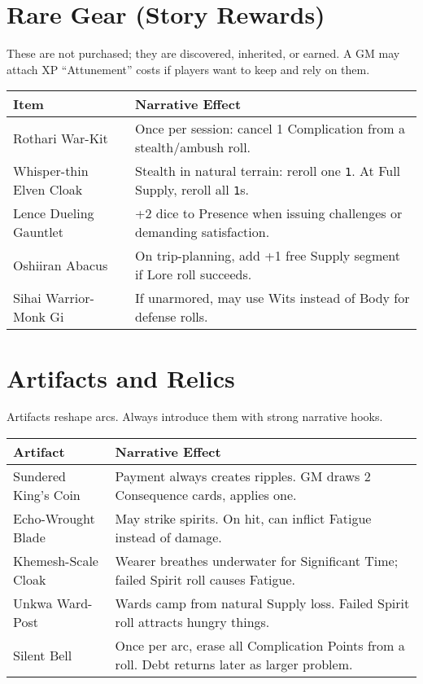 \documentclass[12pt]{book}
\begin{document}
\section{Rare Gear (Story Rewards)}
These are not purchased; they are discovered, inherited, or earned.  
A GM may attach XP “Attunement” costs if players want to keep and rely on them.

\begin{tabularx}{\textwidth}{lX}
\textbf{Item} & \textbf{Narrative Effect} \\
\hline
Rothari War-Kit & Once per session: cancel 1 Complication from a stealth/ambush roll. \\
Whisper-thin Elven Cloak & Stealth in natural terrain: reroll one \texttt{1}. At Full Supply, reroll all \texttt{1}s. \\
Lence Dueling Gauntlet & +2 dice to Presence when issuing challenges or demanding satisfaction. \\
Oshiiran Abacus & On trip-planning, add +1 free Supply segment if Lore roll succeeds. \\
Sihai Warrior-Monk Gi & If unarmored, may use Wits instead of Body for defense rolls. \\
\end{tabularx}

\section{Artifacts and Relics}
Artifacts reshape arcs. Always introduce them with strong narrative hooks.

\begin{tabularx}{\textwidth}{lX}
\textbf{Artifact} & \textbf{Narrative Effect} \\
\hline
Sundered King’s Coin & Payment always creates ripples. GM draws 2 Consequence cards, applies one. \\
Echo-Wrought Blade & May strike spirits. On hit, can inflict Fatigue instead of damage. \\
Khemesh-Scale Cloak & Wearer breathes underwater for Significant Time; failed Spirit roll causes Fatigue. \\
Unkwa Ward-Post & Wards camp from natural Supply loss. Failed Spirit roll attracts hungry things. \\
Silent Bell & Once per arc, erase all Complication Points from a roll. Debt returns later as larger problem. \\
\end{tabularx}
\end{document}
